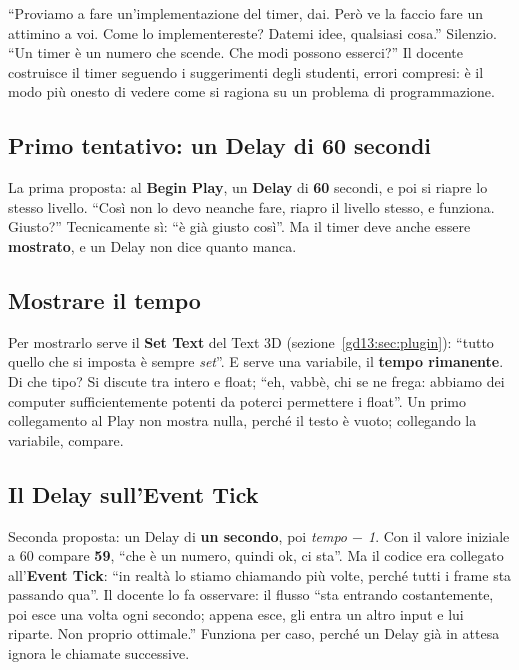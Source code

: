 ``Proviamo a fare un'implementazione del timer, dai. Però ve la faccio fare un
attimino a voi. Come lo implementereste? Datemi idee, qualsiasi cosa.''
Silenzio. ``Un timer è un numero che scende. Che modi possono esserci?'' Il
docente costruisce il timer seguendo i suggerimenti degli studenti, errori
compresi: è il modo più onesto di vedere come si ragiona su un problema di
programmazione.

\subsection{Primo tentativo: un Delay di 60 secondi}

La prima proposta: al \textbf{Begin Play}, un \textbf{Delay} di \textbf{60}
secondi, e poi si riapre lo stesso livello. ``Così non lo devo neanche fare,
riapro il livello stesso, e funziona. Giusto?'' Tecnicamente sì: ``è già giusto
così''. Ma il timer deve anche essere \textbf{mostrato}, e un Delay non dice
quanto manca.

\subsection{Mostrare il tempo}

Per mostrarlo serve il \textbf{Set Text} del Text 3D (sezione~\ref{gd13:sec:plugin}):
``tutto quello che si imposta è sempre \emph{set}''. E serve una variabile, il
\textbf{tempo rimanente}. Di che tipo? Si discute tra intero e float; ``eh,
vabbè, chi se ne frega: abbiamo dei computer sufficientemente potenti da poterci
permettere i float''. Un primo collegamento al Play non mostra nulla, perché il
testo è vuoto; collegando la variabile, compare.

\subsection{Il Delay sull'Event Tick}

Seconda proposta: un Delay di \textbf{un secondo}, poi \emph{tempo $-$ 1}. Con il
valore iniziale a 60 compare \textbf{59}, ``che è un numero, quindi ok, ci
sta''. Ma il codice era collegato all'\textbf{Event Tick}: ``in realtà lo stiamo
chiamando più volte, perché tutti i frame sta passando qua''. Il docente lo fa
osservare: il flusso ``sta entrando costantemente, poi esce una volta ogni
secondo; appena esce, gli entra un altro input e lui riparte. Non proprio
ottimale.'' Funziona per caso, perché un Delay già in attesa ignora le chiamate
successive.

